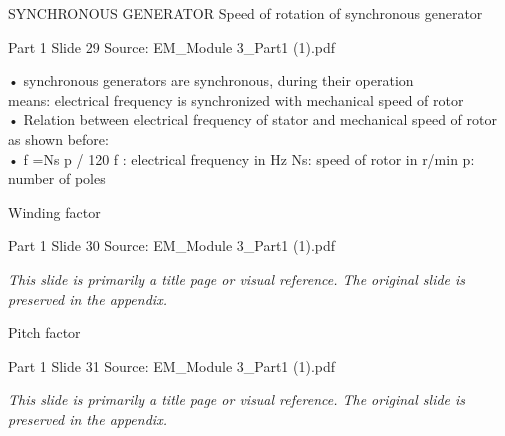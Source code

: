 \documentclass[11pt,a4paper]{article}
\begin{document}
\begin{mdframed}[roundcorner=9pt,backgroundcolor=white,linecolor=anthBlue,linewidth=1pt,innerleftmargin=12pt,innerrightmargin=12pt,innertopmargin=10pt,innerbottommargin=10pt,skipabove=8pt,skipbelow=10pt]
{\HeadingFont\fontsize{15}{18}\selectfont\color{anthDark}SYNCHRONOUS GENERATOR Speed of rotation of synchronous generator\par}
{\color{anthMid}\small Part 1 \textbullet{} Slide 29 \textbullet{} Source: EM\_Module 3\_Part1 (1).pdf\par}
\vspace{0.5em}
{\small
\smallskip
• synchronous generators are synchronous, during their operation\\
means: electrical frequency is synchronized with mechanical speed of rotor\\
• Relation between electrical frequency of stator and mechanical speed of rotor as shown before:\\
•     f =Ns p / 120 f : electrical frequency in Hz Ns: speed of rotor in r/min p: number of poles\\

}
\end{mdframed}

\begin{mdframed}[roundcorner=9pt,backgroundcolor=white,linecolor=anthGreen,linewidth=1pt,innerleftmargin=12pt,innerrightmargin=12pt,innertopmargin=10pt,innerbottommargin=10pt,skipabove=8pt,skipbelow=10pt]
{\HeadingFont\fontsize{15}{18}\selectfont\color{anthDark}Winding factor\par}
{\color{anthMid}\small Part 1 \textbullet{} Slide 30 \textbullet{} Source: EM\_Module 3\_Part1 (1).pdf\par}
\vspace{0.5em}
{\small
\textit{This slide is primarily a title page or visual reference. The original slide is preserved in the appendix.}

}
\end{mdframed}

\begin{mdframed}[roundcorner=9pt,backgroundcolor=white,linecolor=anthOrange,linewidth=1pt,innerleftmargin=12pt,innerrightmargin=12pt,innertopmargin=10pt,innerbottommargin=10pt,skipabove=8pt,skipbelow=10pt]
{\HeadingFont\fontsize{15}{18}\selectfont\color{anthDark}Pitch factor\par}
{\color{anthMid}\small Part 1 \textbullet{} Slide 31 \textbullet{} Source: EM\_Module 3\_Part1 (1).pdf\par}
\vspace{0.5em}
{\small
\textit{This slide is primarily a title page or visual reference. The original slide is preserved in the appendix.}

}
\end{mdframed}
\end{document}
